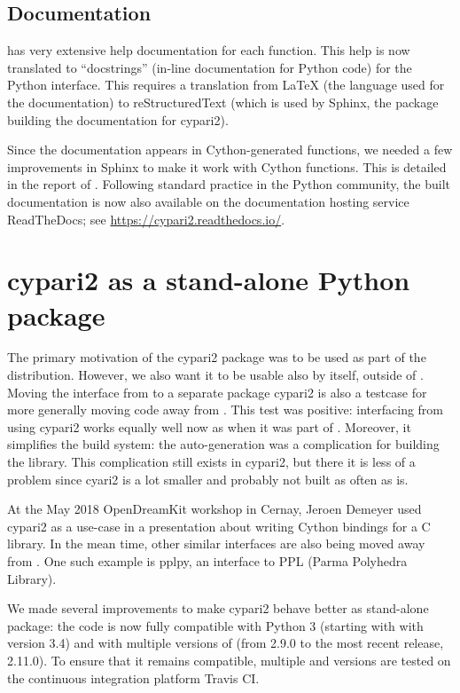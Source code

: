 \documentclass{deliverablereport}
\begin{document}
\subsection{Documentation}

\PariGP has very extensive help documentation for each function.  This help is
now translated to ``docstrings'' (in-line documentation for Python code) for
the Python interface.
This requires a translation from \LaTeX{}
(the language used for the \PariGP documentation)
to reStructuredText (which is used by Sphinx,
the package building the documentation for cypari2).

Since the documentation appears in Cython-generated functions,
we needed a few improvements in Sphinx to make it work
with Cython functions.
This is detailed in the report of .
Following standard practice in the Python community,
the built documentation is now also available on the
documentation hosting service ReadTheDocs;
see \url{https://cypari2.readthedocs.io/}.

\section{cypari2 as a stand-alone Python package}

The primary motivation of the cypari2 package
was to be used as part of the \Sage distribution.
However, we also want it to be usable also by itself, outside of \Sage.
Moving the \PariGP interface from \Sage to a separate package cypari2
is also a testcase for more generally moving code away from \Sage.
This test was positive:
interfacing \PariGP from \Sage using cypari2 works equally well now
as when it was part of \Sage.
Moreover, it simplifies the \Sage build system:
the auto-generation was a complication for building the \Sage library.
This complication still exists in cypari2,
but there it is less of a problem since cyari2 is a lot smaller
and probably not built as often as \Sage is.

At the May 2018 OpenDreamKit workshop in Cernay,
Jeroen Demeyer used cypari2 as a use-case in a presentation
about writing Cython bindings for a C library.
In the mean time,
other similar interfaces are also being moved away from \Sage.
One such example is pplpy, an interface to PPL (Parma Polyhedra Library).

We made several improvements to make cypari2 behave better as stand-alone package:
the code is now fully compatible with Python 3 (starting with with version 3.4)
and with multiple versions of \PariGP (from 2.9.0 to the most recent release, 2.11.0).
To ensure that it remains compatible, multiple \Python and \PariGP
versions are tested on the continuous integration platform Travis CI.
\end{document}
